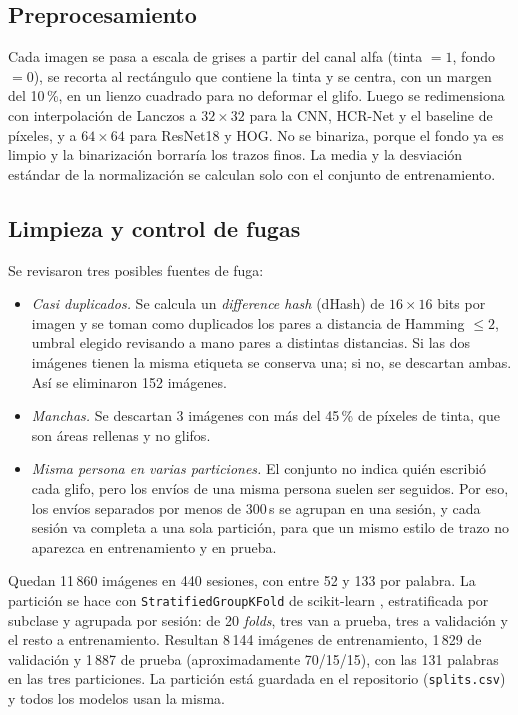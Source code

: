 \documentclass[conference]{IEEEtran}
\begin{document}
\subsection{Preprocesamiento}
Cada imagen se pasa a escala de grises a partir del canal alfa (tinta $=1$,
fondo $=0$), se recorta al rectángulo que contiene la tinta y se centra, con
un margen del 10\,\%, en un lienzo cuadrado para no deformar el glifo. Luego
se redimensiona con interpolación de Lanczos a $32\times32$ para la CNN,
HCR-Net y el baseline de píxeles, y a $64\times64$ para ResNet18 y HOG. No se
binariza, porque el fondo ya es limpio y la binarización borraría los trazos
finos. La media y la desviación estándar de la normalización se calculan solo
con el conjunto de entrenamiento.

\subsection{Limpieza y control de fugas}
Se revisaron tres posibles fuentes de fuga:
\begin{itemize}
  \item \textit{Casi duplicados.} Se calcula un \textit{difference hash}
  (dHash) de $16\times16$ bits por imagen y se toman como duplicados los pares
  a distancia de Hamming $\leq 2$, umbral elegido revisando a mano pares a
  distintas distancias. Si las dos imágenes tienen la misma etiqueta se
  conserva una; si no, se descartan ambas. Así se eliminaron 152 imágenes.
  \item \textit{Manchas.} Se descartan 3 imágenes con más del 45\,\% de
  píxeles de tinta, que son áreas rellenas y no glifos.
  \item \textit{Misma persona en varias particiones.} El conjunto no indica
  quién escribió cada glifo, pero los envíos de una misma persona suelen ser
  seguidos. Por eso, los envíos separados por menos de 300\,s se agrupan en
  una sesión, y cada sesión va completa a una sola partición, para que un
  mismo estilo de trazo no aparezca en entrenamiento y en prueba.
\end{itemize}
Quedan 11\,860 imágenes en 440 sesiones, con entre 52 y 133 por palabra. La
partición se hace con \texttt{StratifiedGroupKFold} de scikit-learn
\cite{pedregosa_sklearn_2011}, estratificada por subclase y agrupada por
sesión: de 20 \textit{folds}, tres van a prueba, tres a validación y el resto
a entrenamiento. Resultan 8\,144 imágenes de entrenamiento, 1\,829 de
validación y 1\,887 de prueba (aproximadamente 70/15/15), con las 131 palabras
en las tres particiones. La partición está guardada en el repositorio
(\texttt{splits.csv}) y todos los modelos usan la misma.
\end{document}
